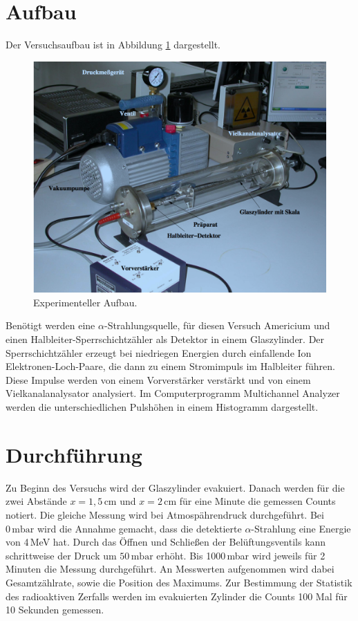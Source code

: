 \section{Aufbau}
Der Versuchsaufbau ist in Abbildung \ref{fig:aufbau} dargestellt.
\begin{figure}
  \centering
  \includegraphics[scale=0.4]{aufbau.png}
  \caption{Experimenteller Aufbau.\cite{anleitung}}
  \label{fig:aufbau}
\end{figure}
\newline
Benötigt werden eine $\alpha$-Strahlungsquelle, für diesen Versuch Americium %
und einen Halbleiter-Sperrschichtzähler als Detektor in einem Glaszylinder. Der Sperrschichtzähler erzeugt bei niedriegen Energien durch einfallende
Ion Elektronen-Loch-Paare, die dann zu einem Stromimpuls im Halbleiter führen. Diese Impulse werden von einem Vorverstärker verstärkt und von einem
Vielkanalanalysator analysiert. Im Computerprogramm Multichannel Analyzer werden die unterschiedlichen Pulshöhen in einem Histogramm dargestellt.

\section{Durchführung}
Zu Beginn des Versuchs wird der Glaszylinder evakuiert. Danach werden für die zwei Abstände $x=1,5\,\mathrm{cm}$ und $x=2\,\mathrm{cm}$
für eine Minute die gemessen Counts notiert. Die gleiche Messung wird bei Atmospährendruck durchgeführt.
\newline
Bei $0\,\mathrm{mbar}$ wird die Annahme gemacht, dass die detektierte $\alpha$-Strahlung eine Energie von 4\,MeV hat.
Durch das Öffnen und Schließen der Belüftungsventils kann schrittweise der Druck um $50\,\mathrm{mbar}$ erhöht. Bis 1000\,mbar wird
jeweils für 2 Minuten die Messung durchgeführt. An Messwerten aufgenommen wird dabei Gesamtzählrate, sowie die Position des Maximums.
\newline
Zur Bestimmung der Statistik des radioaktiven Zerfalls werden im evakuierten Zylinder die Counts 100 Mal für 10 Sekunden gemessen.
